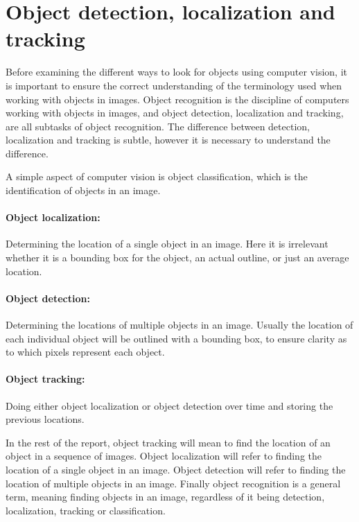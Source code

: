 \section{Object detection, localization and tracking}\label{sec:anal:objdet}
Before examining the different ways to look for objects using computer vision, it is important to ensure the correct understanding of the terminology used when working with objects in images.
Object recognition is the discipline of computers working with objects in images, and object detection, localization and tracking, are all subtasks of object recognition.
The difference between detection, localization and tracking is subtle, however it is necessary to understand the difference\cite{objecttrackdetect}.

A simple aspect of computer vision is object classification, which is the identification of objects in an image.

\paragraph{Object localization:} 
Determining the location of a single object in an image. 
Here it is irrelevant whether it is a bounding box for the object, an actual outline, or just an average location.

\paragraph{Object detection:} 
Determining the locations of multiple objects in an image.
Usually the location of each individual object will be outlined with a bounding box, to ensure clarity as to which pixels represent each object.

\paragraph{Object tracking:} 
Doing either object localization or object detection over time and storing the previous locations.

In the rest of the report, object tracking will mean to find the location of an object in a sequence of images.
Object localization will refer to finding the location of a single object in an image.
Object detection will refer to finding the location of multiple objects in an image.
Finally object recognition is a general term, meaning finding objects in an image, regardless of it being detection, localization, tracking or classification. 
